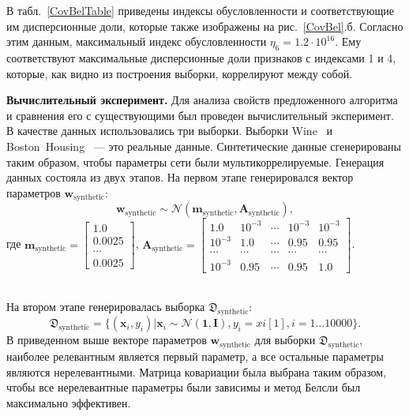 В табл.~\ref{CovBelTable} приведены индексы обусловленности и соответствующие им дисперсионные доли, которые также изображены на рис.~\ref{CovBel}.б. Согласно этим данным, максимальный индекс обусловленности $\eta_6 = 1.2\cdot 10^{16}$. Ему соответствуют максимальные дисперсионные доли признаков с индексами 1 и 4, которые, как видно из построения выборки, коррелируют между собой.


\textbf{Вычислительный эксперимент. }
Для анализа свойств предложенного алгоритма и сравнения его с существующими был проведен вычислительный эксперимент.
В качестве данных использовались три выборки. Выборки Wine~\cite{wine} и Boston~Housing~\cite{boston}  --- это реальные данные. Синтетические данные сгенерированы таким образом, чтобы параметры сети были мультикоррелируемые. Генерация данных состояла из двух этапов. 
На первом этапе генерировался вектор параметров $\mathbf{w}_{\text{synthetic}}$:
$$\mathbf{w}_{\text{synthetic}}  \sim \mathcal{N}(\textbf{m}_{\text{synthetic}}, \textbf{A}_{\text{synthetic}}),$$ 
где 
$\textbf{m}_{\text{synthetic}} = \begin{bmatrix}
1.0\\
0.0025\\
\cdots\\
0.0025
\end{bmatrix}$,
$\textbf{A}_{\text{synthetic}} = \begin{bmatrix}
1.0& 10^{-3}& \cdots& 10^{-3}& 10^{-3}\\
10^{-3}& 1.0& \cdots& 0.95& 0.95\\
\cdots&\cdots&\cdots&\cdots&\cdots\\
10^{-3}& 0.95& \cdots& 0.95& 1.0
\end{bmatrix}$.


~\\На втором этапе генерировалась выборка $\mathfrak{D}_{\text{synthetic}}$:
$$\mathfrak{D}_{\text{synthetic}} = \{(\textbf{x}_i,y_i)| \textbf{x}_i \sim  \mathcal{N}(\textbf{1}, \textbf{I}), y_i = x{i}[1], i = 1 \dots 10000\}.$$
В приведенном выше векторе параметров $\mathbf{w}_{\text{synthetic}}$ для выборки $\mathfrak{D}_{\text{synthetic}}$, наиболее релевантным является первый параметр, а все остальные параметры являются нерелевантными. Матрица ковариации была выбрана таким образом, чтобы все нерелевантные параметры были зависимы и метод Белсли был максимально эффективен.



